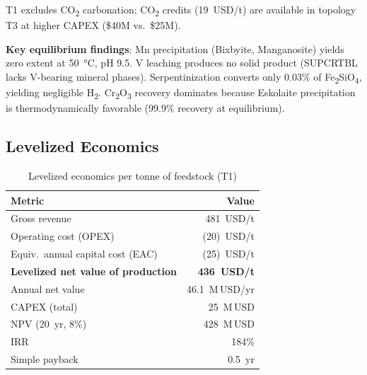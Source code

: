 \documentclass[11pt,a4paper]{article}
\begin{document}
\noindent T1 excludes CO\textsubscript{2} carbonation; CO\textsubscript{2}
credits (\SI{19}{USD/t}) are available in topology T3 at higher CAPEX
(\$40M vs.\ \$25M).

\noindent \textbf{Key equilibrium findings}: Mn precipitation (Bixbyite,
Manganosite) yields zero extent at \SI{50}{\degreeCelsius}, pH 9.5.
V leaching produces no solid product (SUPCRTBL lacks V-bearing mineral
phases).  Serpentinization converts only 0.03\% of Fe\textsubscript{2}SiO\textsubscript{4},
yielding negligible H\textsubscript{2}.  Cr\textsubscript{2}O\textsubscript{3}
recovery dominates because Eskolaite precipitation is
thermodynamically favorable (99.9\% recovery at equilibrium).

\subsection{Levelized Economics}

\begin{table}[H]
\centering
\caption{Levelized economics per tonne of feedstock (T1)}
\label{tab:econ}
\begin{tabular}{@{}lr@{}}
\toprule
\textbf{Metric} & \textbf{Value} \\
\midrule
Gross revenue         & 481~USD/t \\
Operating cost (OPEX) & (20)~USD/t  \\
Equiv.\ annual capital cost (EAC) & (25)~USD/t \\
\midrule
\textbf{Levelized net value of production} & \textbf{436~USD/t} \\
\midrule
Annual net value      & 46.1~M\,USD/yr \\
CAPEX (total)         & 25~M\,USD \\
NPV (20~yr, 8\%)     & 428~M\,USD \\
IRR                   & 184\% \\
Simple payback        & 0.5~yr \\
\bottomrule
\end{tabular}
\end{table}
\end{document}
